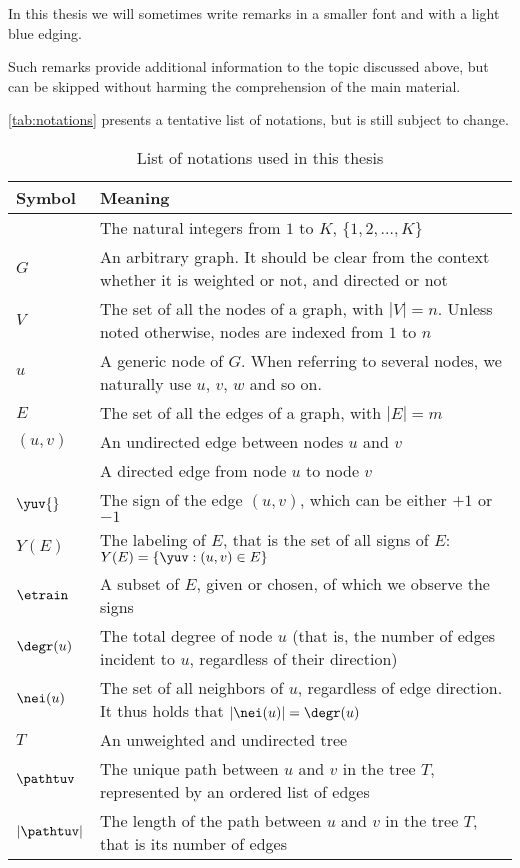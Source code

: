 In this thesis we will sometimes write remarks in a smaller font and with a light blue edging.
\begin{aside}
  Such remarks provide additional information to the topic discussed above, but can be skipped
  without harming the comprehension of the main material.
\end{aside}

\autoref{tab:notations} presents a tentative list of notations, but is still subject to change.

\begin{table*}[thpb]
  \centering
  \caption{List of notations used in this thesis}\label{tab:notations}%
  \vspace{-.5\baselineskip}
  \begin{tabulary}{187mm}{LL}
    \toprule
    Symbol & Meaning \\
    \midrule
    \rangek{} & The natural integers from $1$ to $K$, \ie{} $\{1, 2, \ldots, K \}$ \\
    $G$ & An arbitrary graph. It should be clear from the context whether it is weighted or not, and directed or not \\
    $V$ & The set of all the nodes of a graph, with $|V|=n$. Unless noted otherwise, nodes are indexed from $1$ to $n$ \\
    $u$ & A generic node of $G$. When referring to several nodes, we naturally use $u$, $v$, $w$ and so on. \\
    $E$ & The set of all the edges of a graph, with $|E|=m$ \\
    $(u,v)$ & An undirected edge between nodes $u$ and $v$ \\
    \euv{} & A directed edge from node $u$ to node $v$ \\
    $\yuv{}$ & The sign of the edge $(u,v)$, which can be either $+1$ or $-1$ \\
    $Y(E)$ & The labeling of $E$, that is the set of all signs of $E$: $Y(E) = \{\yuv : (u,v)\in E\}$ \\
    $\etrain$ & A subset of $E$, given or chosen, of which we observe the signs \\
    $\degr(u)$ & The total degree of node $u$ (that is, the number of edges incident to $u$,
    regardless of their direction) \\
    $\nei(u)$ & The set of all neighbors of $u$, regardless of edge direction. It thus holds
    that $|\nei(u)| = \degr(u)$ \\
    $T$ & An unweighted and undirected tree \\
    $\pathtuv$ & The unique path between $u$ and $v$ in the tree $T$, represented by an ordered list of edges \\
    $|\pathtuv|$ & The length of the path between $u$ and $v$ in the tree $T$, that is its number of edges \\
    \bottomrule
  \end{tabulary}
\end{table*}
